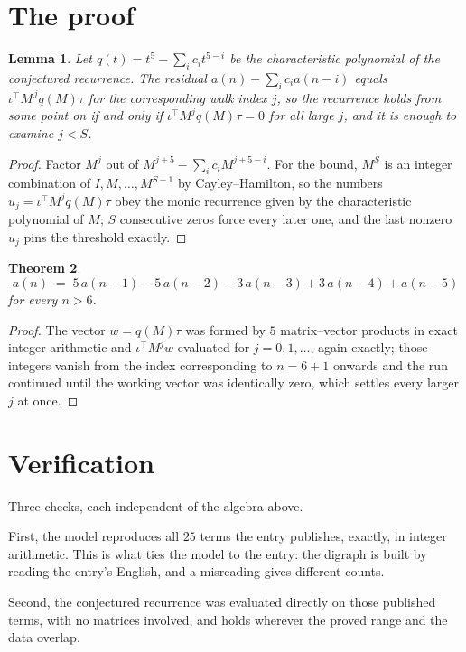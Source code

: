 \documentclass[11pt,a4paper]{article}
\theoremstyle{plain}
\newtheorem{theorem}{Theorem}
\newtheorem{lemma}[theorem]{Lemma}
\theoremstyle{definition}
\begin{document}
\section{The proof}

\begin{lemma}\label{lem:crit}
Let $q(t)=t^{5}-\sum_i c_it^{5-i}$ be the characteristic polynomial of the
conjectured recurrence. The residual $a(n)-\sum_ic_ia(n-i)$ equals
$\iota^{\!\top}M^{\,j}q(M)\tau$ for the corresponding walk index $j$, so the recurrence
holds from some point on if and only if $\iota^{\!\top}M^{j}q(M)\tau=0$ for all large $j$,
and it is enough to examine $j<S$.
\end{lemma}

\begin{proof}
Factor $M^{j}$ out of $M^{j+5}-\sum_ic_iM^{j+5-i}$. For the bound, $M^{S}$
is an integer combination of $I,M,\dots,M^{S-1}$ by Cayley--Hamilton, so the numbers
$u_j=\iota^{\!\top}M^{j}q(M)\tau$ obey the monic recurrence given by the characteristic
polynomial of $M$; $S$ consecutive zeros force every later one, and the last nonzero $u_j$
pins the threshold exactly.
\end{proof}

\begin{theorem}
\[
a(n)\;=\;5\,a(n-1) - 5\,a(n-2) - 3\,a(n-3) + 3\,a(n-4) + a(n-5)
\]
for every $n>6$.
\end{theorem}

\begin{proof}
The vector $w=q(M)\tau$ was formed by $5$ matrix--vector products in exact integer
arithmetic and $\iota^{\!\top}M^{j}w$ evaluated for $j=0,1,\dots$, again exactly; those
integers vanish from the index corresponding to $n=6+1$ onwards and the run continued
until the working vector was identically zero, which settles every larger $j$ at once.
\end{proof}

\section{Verification}

Three checks, each independent of the algebra above.

First, the model reproduces all $25$ terms the entry publishes, exactly, in integer
arithmetic. This is what ties the model to the entry: the digraph is built by reading the
entry's English, and a misreading gives different counts.

Second, the conjectured recurrence was evaluated directly on those published terms, with no
matrices involved, and holds wherever the proved range and the data overlap.
\end{document}
